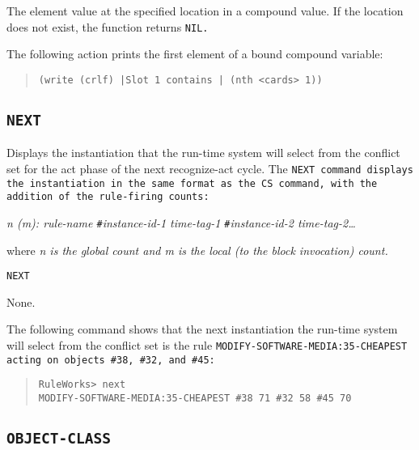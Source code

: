 \ReturnValue

The element value at the specified location in a compound
value. If the location does not exist, the function returns
\tt{NIL}.

\Example

The following action prints the first element of a bound compound
variable:

\begin{quote}
\begin{verbatim}
(write (crlf) |Slot 1 contains | (nth <cards> 1))
\end{verbatim}
\end{quote}

\subsection{\tt{NEXT}}

Displays the instantiation that the run-time system will select from
the conflict set for the act phase of the next recognize-act
cycle. The \tt{NEXT} command displays the instantiation in the same
format as the \tt{CS} command, with the addition of the rule-firing
counts:

\it{n} (\it{m}): \it{rule-name} \verb|#|\it{instance-id-1}
\it{time-tag-1} \verb|#|\it{instance-id-2} \it{time-tag-2}\ldots

where \it{n} is the global count and \it{m} is the local (to the block
invocation) count.

\Format

\tt{NEXT}

\Arguments

None.

\Example

The following command shows that the next instantiation the run-time
system will select from the conflict set is the rule
\tt{MODIFY-SOFTWARE-MEDIA:35-CHEAPEST} acting on objects \verb|#38|,
\verb|#32|, and \verb|#45|:

\begin{quote}
\begin{verbatim}
RuleWorks> next
MODIFY-SOFTWARE-MEDIA:35-CHEAPEST #38 71 #32 58 #45 70
\end{verbatim}
\end{quote}

\subsection{\tt{OBJECT-CLASS}}

